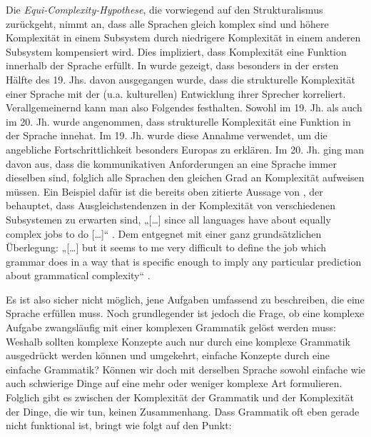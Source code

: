 Die \textit{Equi-Com\-ple\-xi\-ty-Hy\-po\-the\-se}, die vorwiegend auf den Strukturalismus zurückgeht, nimmt an, dass alle Sprachen gleich komplex sind und höhere Komplexität in einem Subsystem durch niedrigere Komplexität in einem anderen Subsystem kompensiert wird. Dies impliziert, dass Komplexität eine Funktion innerhalb der Sprache erfüllt. In  wurde gezeigt, dass besonders in der ersten Hälfte des 19. Jhs. davon ausgegangen wurde, dass die strukturelle Komplexität einer Sprache mit der (u.a. kulturellen) Entwicklung ihrer Sprecher korreliert. Verallgemeinernd kann man also Folgendes festhalten. Sowohl im 19. Jh. als auch im 20. Jh. wurde angenommen, dass strukturelle Komplexität eine Funktion in der Sprache innehat. Im 19. Jh. wurde diese Annahme verwendet, um die angebliche Fortschrittlichkeit besonders Europas zu erklären. Im 20. Jh. ging man davon aus, dass die kommunikativen Anforderungen an eine Sprache immer dieselben sind, folglich alle Sprachen den gleichen Grad an Komplexität aufweisen müssen. Ein Beispiel dafür ist die bereits oben zitierte Aussage von \citet{Hockett1958}, der behauptet, dass Ausgleichstendenzen in der Komplexität von verschiedenen Subsystemen zu erwarten sind, „[…] since all languages have about equally complex jobs to do […]“ \citep[180]{Hockett1958}. Dem entgegnet \citet{Sampson2009} mit einer ganz grundsätzlichen Überlegung: „[…] but it seems to me very difficult to define the job which grammar does in a way that is specific enough to imply any particular prediction about grammatical complexity“ \citep[2]{Sampson2009}.

Es ist also sicher nicht möglich, jene Aufgaben umfassend zu beschreiben, die eine Sprache erfüllen muss. Noch grundlegender ist jedoch die Frage, ob eine komplexe Aufgabe zwangsläufig mit einer komplexen Grammatik gelöst werden muss: Weshalb sollten komplexe Konzepte auch nur durch eine komplexe Grammatik ausgedrückt werden können und umgekehrt, einfache Konzepte durch eine einfache Grammatik? Können wir doch mit derselben Sprache sowohl einfache wie auch schwierige Dinge auf eine mehr oder weniger komplexe Art formulieren. Folglich gibt es zwischen der Komplexität der Grammatik und der Komplexität der Dinge, die wir tun, keinen Zusammenhang. Dass Grammatik oft eben gerade nicht funktional ist, bringt \citet{Gil2009} wie folgt auf den Punkt:


